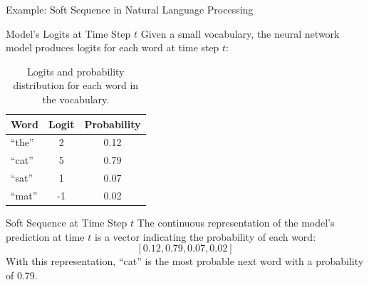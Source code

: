 \documentclass{beamer}
\begin{document}
\begin{frame}{Example: Soft Sequence in Natural Language Processing}
    \begin{block}{Model's Logits at Time Step $t$}
        Given a small vocabulary, the neural network model produces logits for each word at time step $t$:
    \end{block}

    \begin{table}
        \centering
        \begin{tabular}{lcc}
            \textbf{Word} & \textbf{Logit} & \textbf{Probability} \\
            \hline
            ``the''       & 2              & 0.12                 \\
            ``cat''       & 5              & 0.79                 \\
            ``sat''       & 1              & 0.07                 \\
            ``mat''       & -1             & 0.02                 \\
        \end{tabular}
        \caption{Logits and probability distribution for each word in the vocabulary.}
    \end{table}

    \begin{block}{Soft Sequence at Time Step $t$}
        The continuous representation of the model's prediction at time $t$ is a vector indicating the probability of each word:
        \[
            [0.12, 0.79, 0.07, 0.02]
        \]
        With this representation, ``cat'' is the most probable next word with a probability of 0.79.
    \end{block}
\end{frame}
\end{document}
